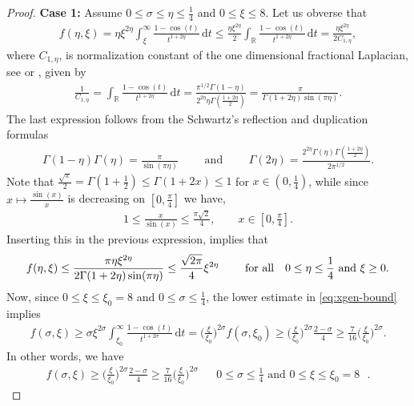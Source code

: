 \documentclass[12pt, reqno]{amsart}%
\theoremstyle{plain}  %
\theoremstyle{definition}  %
\theoremstyle{remark}
\numberwithin{equation}{section}
\DeclareMathOperator{\R}{\mathbb{R}}
\renewcommand{\d}{\,\mathrm{d}}
\begin{document}
\begin{proof}
\textbf{Case 1: }
Assume $0\leq \sigma\leq \eta\leq \frac{1}{4}$ and $0\leq \xi\leq 8$. Let us obverse that
\begin{align*}
f(\eta,\xi)=\eta  \xi^{2\eta}  \int_{\xi}^\infty \frac{1-\cos (t)}{t^{1+2\eta}}\d t\leq \frac{\eta \xi^{2\eta}}{2}\int_{\R} \frac{1-\cos (t)}{t^{1+2\eta}}\d t=  \frac{\eta \xi^{2\eta} }{2 C_{1,\eta}} ,
\end{align*}
where $C_{1,\eta}$,  is normalization constant of the one dimensional fractional Laplacian, see \cite[Section 2.3]{guy-thesis} or \cite[Chapter 1]{BuVa16},  given by
\begin{align*}
\frac{1}{C_{1,\eta}} = \int_{\R} \frac{1-\cos (t)}{t^{1+2\eta}}\d t =\frac{\pi^{1/2} \Gamma(1 - \eta)}{2^{2\eta} \eta\Gamma\left( \frac{1 + 2\eta}{2} \right)}=  \frac{ \pi}{ \Gamma(1+2\eta) \sin(\pi \eta)}.
\end{align*}
The last expression follows from   the Schwartz's reflection and duplication formulas
\begin{align*}
\Gamma(1-\eta)\Gamma (\eta)= \frac{\pi}{\sin (\pi\eta)}\qquad \text{ and }\qquad  \Gamma(2\eta)= \frac{2^{2\eta} \Gamma(\eta)\Gamma(\tfrac{1+2\eta}{2})}{2\pi^{1/2}}.
\end{align*}
Note that $\frac{\sqrt{\pi}}{2}= \Gamma(1+\tfrac{1}{2})\leq \Gamma(1+2x)\leq 1$  for $x\in (0,\frac{1}{4})$,  while since $x\mapsto \frac{\sin (x)}{x} $ is decreasing on $ [0, \frac{\pi}{4}]$ we have,
\begin{align*}
1\leq \frac{x}{\sin (x)}\leq \frac{\pi\sqrt{2}}{4},\qquad x\in [0, \frac{\pi}{4}].
\end{align*}
Inserting this in the previous expression,  implies that
\begin{align}\label{eq:eta-less-quart-upb}
f(\eta,\xi)\leq \frac{ \pi\eta \xi^{2\eta}}{ 2\Gamma(1+2\eta) \sin(\pi \eta)}\leq \frac{\sqrt{2\pi}}{4}\xi^{2\eta}
&&\quad \text{ for all  \,\, $0\leq \eta\leq \frac{1}{4}$ and $\xi\geq 0$}.
\end{align}
Now, since $0\leq \xi\leq \xi_0=8$ and $0\leq \sigma\leq \frac{1}{4}$, the lower estimate in \eqref{eq:xgen-bound} implies
\begin{align*}
f(\sigma,\xi)\geq \sigma \xi^{2\sigma}  \int_{\xi_0}^\infty \frac{1-\cos (t)}{t^{1+2\sigma}}\d t= \big(\frac{\xi}{\xi_0}\big)^{2\sigma}f(\sigma,\xi_0)\geq\big(\frac{\xi}{\xi_0}\big)^{2\sigma} \frac{2-\sigma}{4}\geq \frac{7}{16} \big(\frac{\xi}{\xi_0}\big)^{2\sigma}.
\end{align*}
In other words, we have 
\begin{align}\label{eq:sigma-less-quart-lob}
f(\sigma,\xi)\geq\big(\frac{\xi}{\xi_0}\big)^{2\sigma} \frac{2-\sigma}{4}\geq \frac{7}{16} \big(\frac{\xi}{\xi_0}\big)^{2\sigma}&&\text{$0\leq \sigma\leq \frac{1}{4}$ and $0\leq \xi\leq \xi_0=8$ }.
\end{align}


\end{proof}
\end{document}
